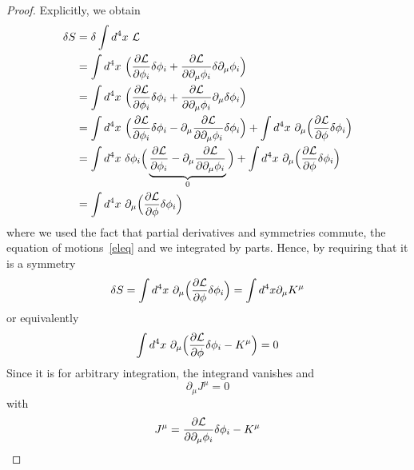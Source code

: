 \begin{proof}
        Explicitly, we obtain 
        \begin{equation*}
        \begin{aligned}
            \delta S & = \delta \int d^4 x ~ \mathcal L \\ & = \int d^4 x ~ \Big ( \frac{\partial\mathcal L}{\partial\phi_i} \delta \phi_i + \frac{\partial\mathcal L}{\partial\partial_\mu \phi_i} \delta \partial_\mu \phi_i\Big) \\ & =  \int d^4 x ~ \Big ( \frac{\partial\mathcal L}{\partial\phi_i} \delta \phi_i + \frac{\partial\mathcal L}{\partial\partial_\mu \phi_i} \partial_\mu \delta \phi_i \Big) \\ & =  \int d^4 x ~ \Big ( \frac{\partial\mathcal L}{\partial\phi_i} \delta \phi_i - \partial_\mu \frac{\partial\mathcal L}{\partial\partial_\mu \phi_i} \delta \phi_i \Big) + \int d^4 x ~ \partial_\mu \Big ( \frac{\partial\mathcal L}{\partial\phi} \delta \phi_i \Big)\\ & =  \int d^4 x ~ \delta \phi_i \Big ( \underbrace{\frac{\partial\mathcal L}{\partial\phi_i} - \partial_\mu \frac{\partial\mathcal L}{\partial\partial_\mu \phi_i}}_0 \Big) + \int d^4 x ~ \partial_\mu \Big ( \frac{\partial\mathcal L}{\partial\phi} \delta \phi_i \Big) \\ & = \int d^4 x ~ \partial_\mu \Big ( \frac{\partial\mathcal L}{\partial\phi} \delta \phi_i \Big)
        \end{aligned}
        \end{equation*}
        where we used the fact that partial derivatives and symmetries commute, the equation of motions~\eqref{eleq} and we integrated by parts. Hence, by requiring that it is a symmetry
        \begin{equation*}
            \delta S = \int d^4 x ~ \partial_\mu \Big ( \frac{\partial\mathcal L}{\partial\phi} \delta \phi_i \Big) = \int d^4 x \partial_\mu K^\mu
        \end{equation*}
        or equivalently 
        \begin{equation*}
            \int d^4 x ~ \partial_\mu \Big ( \frac{\partial\mathcal L}{\partial\phi} \delta \phi_i - K^\mu \Big) = 0
        \end{equation*}
        Since it is for arbitrary integration, the integrand vanishes and 
        \begin{equation*}
            \partial_\mu J^\mu = 0
        \end{equation*}
        with 
        \begin{equation*}
            J^\mu = \frac{\partial\mathcal L}{\partial\partial_\mu \phi_i} \delta \phi_i - K^\mu
        \end{equation*}
    \end{proof}

